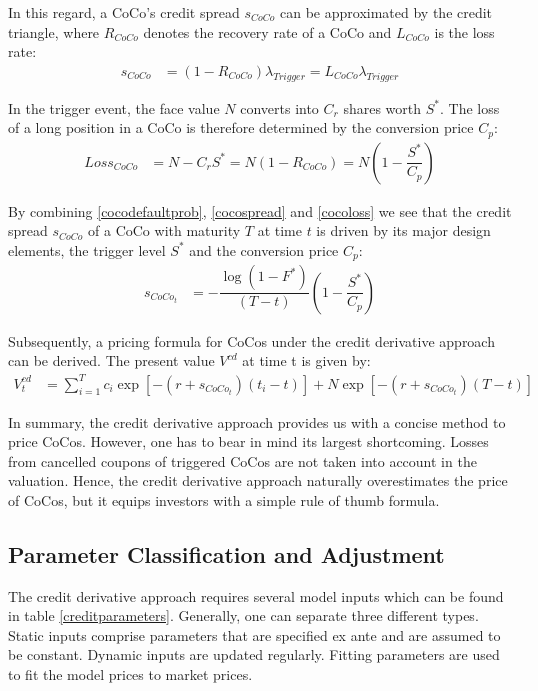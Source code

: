 In this regard, a CoCo's credit spread $s_{CoCo}$ can be approximated by the credit triangle, where $R_{CoCo}$ denotes the recovery rate of a CoCo and $L_{CoCo}$ is the loss rate:
\begin{align} \label{cocospread}
    s_{CoCo} &= \left(1 - R_{CoCo}\right) \lambda_{Trigger} = {L}_{CoCo} \lambda_{Trigger}
\end{align}

In the trigger event, the face value $N$ converts into $C_r$ shares worth $S^*$. The loss of a long position in a CoCo is therefore determined by the conversion price $C_p$:
\begin{align} \label{cocoloss}
    {Loss}_{CoCo} &= N - C_r S^* = N \left(1 - R_{CoCo} \right) = N \left(1 - \dfrac{S^*}{C_p} \right)
\end{align} 

By combining \ref{cocodefaultprob}, \ref{cocospread} and \ref{cocoloss} we see that the credit spread $s_{CoCo}$ of a CoCo with maturity $T$ at time $t$ is driven by its major design elements, the trigger level $S^*$ and the conversion price $C_p$:
\begin{align}
s_{CoCo_t}&= - \dfrac{\log (1 - F^*)}{(T - t)} \left( 1 - \dfrac{S^*}{C_p} \right)
\end{align}

Subsequently, a pricing formula for CoCos under the credit derivative approach can be derived. The present value $V^{cd}$ at time t is given by:
\begin{align}
V^{cd}_t &= \sum^T_{i=1} c_i \exp\left[-(r + s_{CoCo_t}) (t_i - t)\right] + N \exp\left[-(r+s_{CoCo_t}) (T-t) \right]
\end{align}

In summary, the credit derivative approach provides us with a concise method to price CoCos. However, one has to bear in mind its largest shortcoming. Losses from cancelled coupons of triggered CoCos are not taken into account in the valuation. Hence, the credit derivative approach naturally overestimates the price of CoCos, but it equips investors with a simple rule of thumb formula. 

\subsection{Parameter Classification and Adjustment} \label{creditparameterssection}
The credit derivative approach requires several model inputs which can be found in table \ref{creditparameters}. Generally, one can separate three different types. Static inputs comprise parameters that are specified ex ante and are assumed to be constant. Dynamic inputs are updated regularly. Fitting parameters are used to fit the model prices to market prices. \citep{wilkens2014contingent}

